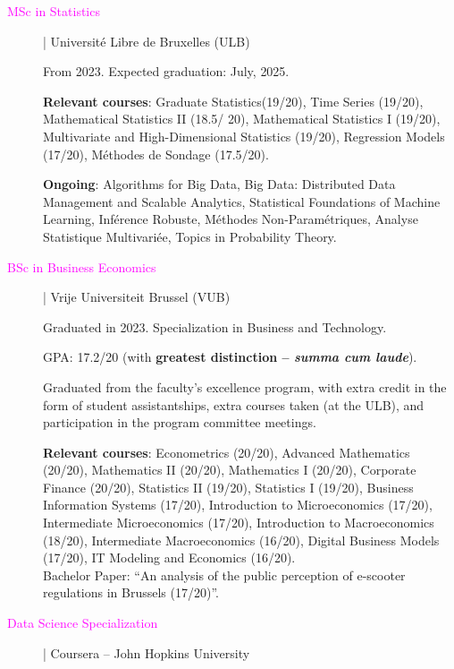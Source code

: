 \documentclass[12pt]{article}
\newcommand{\mycolor}{Fuchsia}
\begin{document}
\begin{description}

\item[\textcolor{\mycolor}{MSc in Statistics}] | Université Libre de Bruxelles (ULB)

From 2023. Expected graduation: July, 2025.

\textbf{Relevant courses}: Graduate Statistics(19/20), Time Series (19/20), Mathematical Statistics II (18.5/ 20), Mathematical Statistics I (19/20), Multivariate and High-Dimensional Statistics (19/20), Regression Models (17/20), Méthodes de Sondage (17.5/20).
  
\textbf{Ongoing}: Algorithms for Big Data, Big Data: Distributed Data Management and Scalable Analytics, Statistical Foundations of Machine Learning, Inférence Robuste, Méthodes Non-Paramétriques, Analyse Statistique Multivariée, Topics in Probability Theory.

\item[\textcolor{\mycolor}{BSc in Business Economics}] | Vrije Universiteit Brussel (VUB)

Graduated in 2023. Specialization in Business and Technology.
  
GPA: 17.2/20 (with \textbf{greatest distinction -- \emph{summa cum laude}}).

Graduated from the faculty's excellence program, with extra credit in the form of student assistantships, extra courses taken (at the ULB), and participation in the program committee meetings.

\textbf{Relevant courses}: Econometrics (20/20), Advanced Mathematics (20/20), Mathematics II (20/20), Mathematics I (20/20), Corporate Finance (20/20), Statistics II (19/20), Statistics I (19/20), Business Information Systems (17/20), Introduction to Microeconomics (17/20), Intermediate Microeconomics (17/20), Introduc\-tion to Macroeconomics (18/20), Intermediate Macroeconomics (16/20), Digital Business Models (17/20), IT Modeling and Economics (16/20).\\

Bachelor Paper: ``An analysis of the public perception of e-scooter regulations in Brussels (17/20)''.

\item[\textcolor{\mycolor}{Data Science Specialization}] | Coursera -- John Hopkins University
  
  

\end{description}
\end{document}
